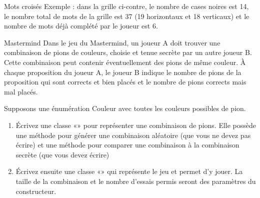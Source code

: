 \begin{Exercice}{Mots croisés}
	Exemple : dans la grille ci-contre, le nombre de cases noires est 14, le
	nombre total de mots de la grille est 37 (19 horizontaux et 18
	verticaux) et le nombre de mots déjà complété par le joueur est 6.
\end{Exercice}

\begin{Exercice}{Mastermind}
	Dans le jeu du Mastermind, un joueur A doit
	trouver une combinaison de
	 pions de couleurs, choisie et tenue secrète
	par un autre joueur B. Cette combinaison peut contenir éventuellement
	des pions de même couleur. À chaque proposition du joueur A, le joueur
	B indique le nombre de pions de la proposition qui sont corrects et
	bien placés et le nombre de pions corrects mais mal placés. 

	Supposons une énumération Couleur avec toutes les couleurs possibles de
	pion.

	\begin{enumerate}[label=\alph*)]
		\item
			Écrivez une classe «» pour
			représenter une combinaison de  pions. Elle
			possède une méthode pour générer une combinaison aléatoire (que vous ne
			devez pas écrire) et une méthode pour comparer une combinaison à la
			combinaison secrète (que vous devez écrire)
		\item
			Écrivez ensuite une classe «» qui
			représente le jeu et permet d’y jouer. La taille de la combinaison et
			le nombre d’essais permis seront des paramètres du constructeur.
	\end{enumerate}
\end{Exercice}

